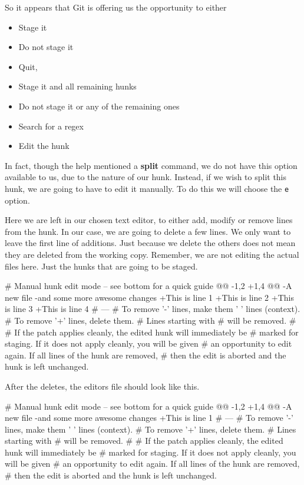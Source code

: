 So it appears that Git is offering us the opportunity to either 
\begin{itemize}
\item Stage it
\item Do not stage it
\item Quit, 
\item Stage it and all remaining hunks
\item Do not stage it or any of the remaining ones
\item Search for a regex
\item Edit the hunk
\end{itemize}

In fact, though the help mentioned a \textbf{split} command, we do not have this option available to us, due to the nature of our hunk.  Instead, if we wish to split this hunk, we are going to have to edit it manually.  To do this we will choose the \texttt{e} option.

Here we are left in our chosen text editor, to either add, modify or remove lines from the hunk.  In our case, we are going to delete a few lines.  We only want to leave the first line of additions.  Just because we delete the others does not mean they are deleted from the working copy.  Remember, we are not editing the actual files here.  Just the hunks that are going to be staged.

\begin{code}
# Manual hunk edit mode -- see bottom for a quick guide
@@ -1,2 +1,4 @@
-A new file
-and some more awesome changes
+This is line 1
+This is line 2
+This is line 3
+This is line 4
# ---
# To remove '-' lines, make them ' ' lines (context).
# To remove '+' lines, delete them.
# Lines starting with # will be removed.
#
# If the patch applies cleanly, the edited hunk will immediately be
# marked for staging. If it does not apply cleanly, you will be given
# an opportunity to edit again. If all lines of the hunk are removed,
# then the edit is aborted and the hunk is left unchanged.
\end{code}

After the deletes, the editors file should look like this.

\begin{code}
# Manual hunk edit mode -- see bottom for a quick guide
@@ -1,2 +1,4 @@
-A new file
-and some more awesome changes
+This is line 1
# ---
# To remove '-' lines, make them ' ' lines (context).
# To remove '+' lines, delete them.
# Lines starting with # will be removed.
#
# If the patch applies cleanly, the edited hunk will immediately be
# marked for staging. If it does not apply cleanly, you will be given
# an opportunity to edit again. If all lines of the hunk are removed,
# then the edit is aborted and the hunk is left unchanged.
\end{code}

